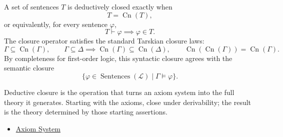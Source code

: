 \begin{remark*}
A set of sentences $T$ is deductively closed exactly when
\[
  T=\operatorname{Cn}(T),
\]
or equivalently, for every sentence $\varphi$,
\[
  T\vdash\varphi \implies \varphi\in T.
\]
The closure operator satisfies the standard Tarskian closure laws:
\[
  \Gamma\subseteq\operatorname{Cn}(\Gamma),
  \qquad
  \Gamma\subseteq\Delta\implies
  \operatorname{Cn}(\Gamma)\subseteq\operatorname{Cn}(\Delta),
  \qquad
  \operatorname{Cn}(\operatorname{Cn}(\Gamma))
  =\operatorname{Cn}(\Gamma).
\]
By completeness for first-order logic, this syntactic closure agrees with the
semantic closure
\[
  \{\varphi\in\operatorname{Sentences}(\mathcal{L})\mid
    \Gamma\vDash\varphi\}.
\]
\end{remark*}

\begin{remark*}[Interpretation]
Deductive closure is the operation that turns an axiom system into the full
theory it generates. Starting with the axioms, close under derivability; the
result is the theory determined by those starting assertions.
\end{remark*}

\begin{dependencies}
\begin{itemize}
  \item \hyperref[def:axiom-system]{Axiom System}
\end{itemize}
\end{dependencies}

